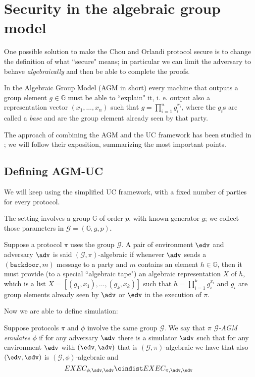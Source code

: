 \section{Security in the algebraic group model}

One possible solution to make the Chou and Orlandi protocol secure is to change the definition of what ``secure" means; in particular we can limit the adversary to behave \emph{algebraically} and then be able to complete the proofs.

In the Algebraic Group Model (AGM in short) every machine that outputs a group element $g\in\mathbb G$ must be able to ``explain" it, i. e. output also a representation vector $(x_1,\dots,x_n)$ such that $g=\prod_{i=1}^n g_i^{x_i}$, where the $g_i$s are called a \emph{base} and are the group element already seen by that party.

The approach of combining the AGM and the UC framework has been studied in \cite{AGM_UC}; we will follow their exposition, summarizing the most important points.

\subsection{Defining AGM-UC}

We will keep using the simplified UC framework, with a fixed number of parties for every protocol.

The setting involves a group $\mathbb G$ of order $p$, with known generator $g$; we collect those parameters in $\mathcal G=(\mathbb G, g, p)$.

\begin{definition}
    Suppose a protocol $\pi$ uses the group $\mathcal G$. A pair of environment $\edv$ and adversary $\adv$ is said $(\mathcal G,\pi)$-algebraic if whenever $\adv$ sends a $(\texttt{backdoor}, m)$ message to a party and $m$ contains an element $h\in\mathbb G$, then it must provide (to a special ``algebraic tape") an algebraic representation $X$ of $h$, which is a list $X=[(g_1,x_1),\dots,(g_k,x_k)]$ such that $h=\prod_{i=1}^kg_i^{x_i}$ and $g_i$ are group elements already seen by $\adv$ or $\edv$ in the execution of $\pi$.
\end{definition}

Now we are able to define simulation:

\begin{definition}
    Suppose protocols $\pi$ and $\phi$ involve the same group $\mathcal G$. We say that $\pi$ \emph{$\mathcal G$-AGM emulates} $\phi$ if for any adversary $\adv$ there is a simulator $\sdv$ such that for any environment $\edv$ with $(\edv,\adv)$ that is $(\mathcal G, \pi)$-algebraic we have that also $(\edv,\sdv)$ is $(\mathcal G, \phi)$-algebraic and
    $$EXEC_{\phi,\sdv,\edv} \cindist EXEC_{\pi,\adv,\edv}$$
\end{definition}

